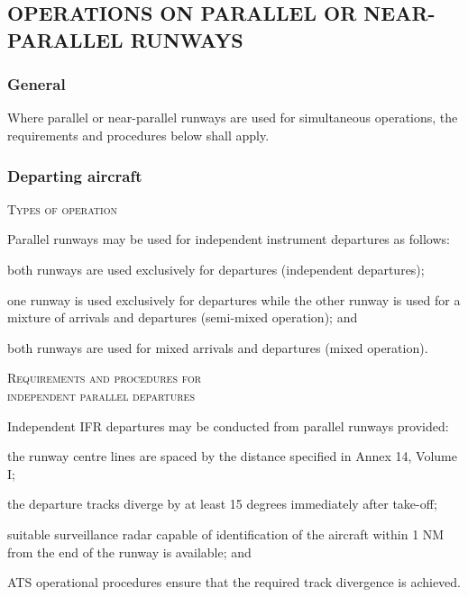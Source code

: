 \subsection[Operations on parallel or near-parallel runways]{OPERATIONS ON PARALLEL OR NEAR-PARALLEL RUNWAYS}

\subsubsection{General}

Where parallel or near-parallel runways are used for simultaneous operations, the requirements and procedures below shall apply.

\subsubsection{Departing aircraft}

\begin{enumeratesc}
    \item \textsc{Types of operation}
    \begin{enumempty}
        \item Parallel runways may be used for independent instrument departures as follows:
    \end{enumempty}
    \begin{enumalph}
        \item both runways are used exclusively for departures (independent departures);
        \item one runway is used exclusively for departures while the other runway is used for a mixture of arrivals and departures (semi-mixed operation); and
        \item both runways are used for mixed arrivals and departures (mixed operation).
    \end{enumalph}

    \item \textsc{Requirements and procedures for \\ independent parallel departures}
    \begin{enumempty}
        \item Independent IFR departures may be conducted from parallel runways provided:
    \end{enumempty}
    \begin{enumalph}
        \item the runway centre lines are spaced by the distance specified in Annex 14, Volume I;
        \item the departure tracks diverge by at least 15 degrees immediately after take-off;
        \item suitable surveillance radar capable of identification of the aircraft within 1 NM from the end of the runway is available; and
        \item ATS operational procedures ensure that the required track divergence is achieved.
    \end{enumalph}
\end{enumeratesc}

